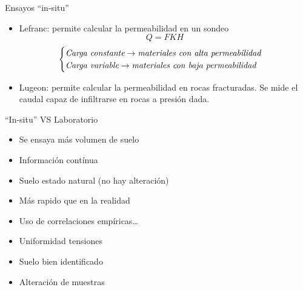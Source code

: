 \begin{mybox}{Ensayos ``in-situ''}

	\begin{itemize}
		\item Lefranc: permite calcular la permeabilidad en un sondeo
		\[
			Q = FKH
		\]
		\begin{equation}
			\begin{cases}
				\emph{Carga constante} \rightarrow \emph{materiales con alta permeabilidad}\\
				\emph{Carga variable} \rightarrow \emph{materiales con baja permeabilidad}
			\end{cases}
	\end{equation}
		\item Lugeon: permite calcular la permeabilidad en rocas fracturadas. Se mide el caudal capaz de infiltrarse en rocas a presión dada.
	\end{itemize}
\end{mybox}

\begin{mybox}[sidebyside,sidebyside align =top]{``In-situ'' VS Laboratorio}
	\begin{itemize}
		\item Se ensaya más volumen de suelo
		\item Información contínua
		\item Suelo estado natural (no hay alteración)
		\item Más rapido que en la realidad
		\item Uso de correlaciones empíricas…
	\end{itemize}
	\tcblower
	\begin{itemize}
		\item Uniformidad tensiones
		\item Suelo bien identificado
		\item Alteración de muestras
	\end{itemize}
\end{mybox}

